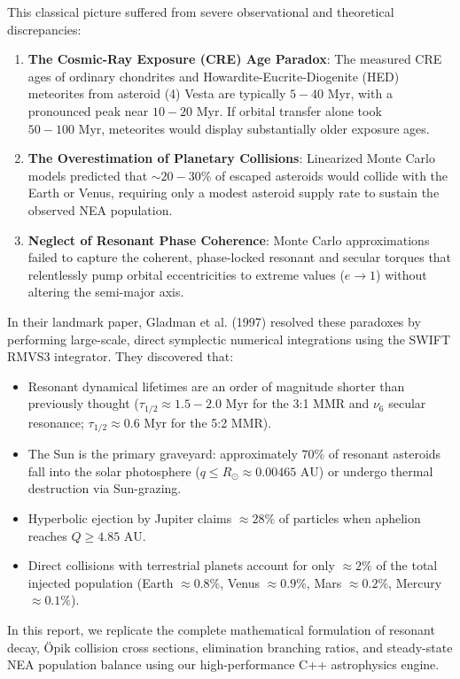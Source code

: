 \documentclass[11pt,a4paper]{article}
\begin{document}
This classical picture suffered from severe observational and theoretical discrepancies:
\begin{enumerate}
    \item \textbf{The Cosmic-Ray Exposure (CRE) Age Paradox}: The measured CRE ages of ordinary chondrites and Howardite-Eucrite-Diogenite (HED) meteorites from asteroid (4) Vesta are typically $5-40\text{ Myr}$, with a pronounced peak near $10-20\text{ Myr}$. If orbital transfer alone took $50-100\text{ Myr}$, meteorites would display substantially older exposure ages.
    \item \textbf{The Overestimation of Planetary Collisions}: Linearized Monte Carlo models predicted that $\sim 20-30\%$ of escaped asteroids would collide with the Earth or Venus, requiring only a modest asteroid supply rate to sustain the observed NEA population.
    \item \textbf{Neglect of Resonant Phase Coherence}: Monte Carlo approximations failed to capture the coherent, phase-locked resonant and secular torques that relentlessly pump orbital eccentricities to extreme values ($e \to 1$) without altering the semi-major axis.
\end{enumerate}

In their landmark paper, Gladman et al. (1997) resolved these paradoxes by performing large-scale, direct symplectic numerical integrations using the SWIFT RMVS3 integrator. They discovered that:
\begin{itemize}
    \item Resonant dynamical lifetimes are an order of magnitude shorter than previously thought ($\tau_{1/2} \approx 1.5-2.0\text{ Myr}$ for the 3:1 MMR and $\nu_6$ secular resonance; $\tau_{1/2} \approx 0.6\text{ Myr}$ for the 5:2 MMR).
    \item The Sun is the primary graveyard: approximately $70\%$ of resonant asteroids fall into the solar photosphere ($q \le R_\odot \approx 0.00465\text{ AU}$) or undergo thermal destruction via Sun-grazing.
    \item Hyperbolic ejection by Jupiter claims $\approx 28\%$ of particles when aphelion reaches $Q \ge 4.85\text{ AU}$.
    \item Direct collisions with terrestrial planets account for only $\approx 2\%$ of the total injected population (Earth $\approx 0.8\%$, Venus $\approx 0.9\%$, Mars $\approx 0.2\%$, Mercury $\approx 0.1\%$).
\end{itemize}

In this report, we replicate the complete mathematical formulation of resonant decay, Öpik collision cross sections, elimination branching ratios, and steady-state NEA population balance using our high-performance C++ astrophysics engine.
\end{document}
